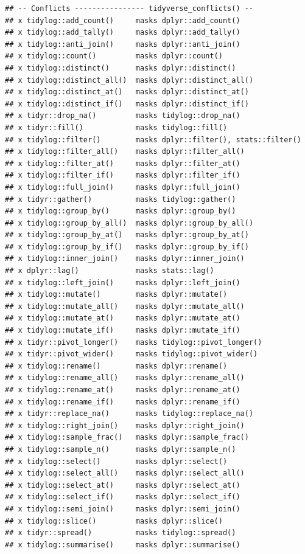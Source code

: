 \documentclass[
]{book}
\begin{document}
\begin{verbatim}
## -- Conflicts ---------------- tidyverse_conflicts() --
## x tidylog::add_count()     masks dplyr::add_count()
## x tidylog::add_tally()     masks dplyr::add_tally()
## x tidylog::anti_join()     masks dplyr::anti_join()
## x tidylog::count()         masks dplyr::count()
## x tidylog::distinct()      masks dplyr::distinct()
## x tidylog::distinct_all()  masks dplyr::distinct_all()
## x tidylog::distinct_at()   masks dplyr::distinct_at()
## x tidylog::distinct_if()   masks dplyr::distinct_if()
## x tidyr::drop_na()         masks tidylog::drop_na()
## x tidyr::fill()            masks tidylog::fill()
## x tidylog::filter()        masks dplyr::filter(), stats::filter()
## x tidylog::filter_all()    masks dplyr::filter_all()
## x tidylog::filter_at()     masks dplyr::filter_at()
## x tidylog::filter_if()     masks dplyr::filter_if()
## x tidylog::full_join()     masks dplyr::full_join()
## x tidyr::gather()          masks tidylog::gather()
## x tidylog::group_by()      masks dplyr::group_by()
## x tidylog::group_by_all()  masks dplyr::group_by_all()
## x tidylog::group_by_at()   masks dplyr::group_by_at()
## x tidylog::group_by_if()   masks dplyr::group_by_if()
## x tidylog::inner_join()    masks dplyr::inner_join()
## x dplyr::lag()             masks stats::lag()
## x tidylog::left_join()     masks dplyr::left_join()
## x tidylog::mutate()        masks dplyr::mutate()
## x tidylog::mutate_all()    masks dplyr::mutate_all()
## x tidylog::mutate_at()     masks dplyr::mutate_at()
## x tidylog::mutate_if()     masks dplyr::mutate_if()
## x tidyr::pivot_longer()    masks tidylog::pivot_longer()
## x tidyr::pivot_wider()     masks tidylog::pivot_wider()
## x tidylog::rename()        masks dplyr::rename()
## x tidylog::rename_all()    masks dplyr::rename_all()
## x tidylog::rename_at()     masks dplyr::rename_at()
## x tidylog::rename_if()     masks dplyr::rename_if()
## x tidyr::replace_na()      masks tidylog::replace_na()
## x tidylog::right_join()    masks dplyr::right_join()
## x tidylog::sample_frac()   masks dplyr::sample_frac()
## x tidylog::sample_n()      masks dplyr::sample_n()
## x tidylog::select()        masks dplyr::select()
## x tidylog::select_all()    masks dplyr::select_all()
## x tidylog::select_at()     masks dplyr::select_at()
## x tidylog::select_if()     masks dplyr::select_if()
## x tidylog::semi_join()     masks dplyr::semi_join()
## x tidylog::slice()         masks dplyr::slice()
## x tidyr::spread()          masks tidylog::spread()
## x tidylog::summarise()     masks dplyr::summarise()

\end{verbatim}
\end{document}
